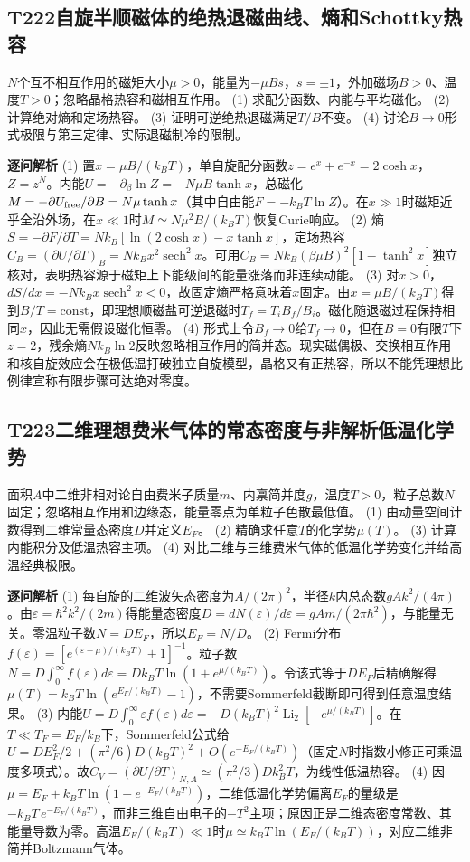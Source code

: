 \subsection*{T222\quad 自旋半顺磁体的绝热退磁曲线、熵和Schottky热容}
$N$个互不相互作用的磁矩大小$\mu>0$，能量为$-\mu Bs$，$s=\pm1$，外加磁场$B>0$、温度$T>0$；忽略晶格热容和磁相互作用。
(1) 求配分函数、内能与平均磁化。
(2) 计算绝对熵和定场热容。
(3) 证明可逆绝热退磁满足$T/B$不变。
(4) 讨论$B\to0$形式极限与第三定律、实际退磁制冷的限制。
\par\textbf{逐问解析}
(1) 置$x=\mu B/(k_BT)$，单自旋配分函数$z=e^x+e^{-x}=2\cosh x$，$Z=z^N$。内能$U=-\partial_\beta\ln Z=-N\mu B\tanh x$，总磁化$M=-\partial U_{\rm free}/\partial B=N\mu\tanh x$（其中自由能$F=-k_BT\ln Z$）。在$x\gg1$时磁矩近乎全沿外场，在$x\ll1$时$M\simeq N\mu^2B/(k_BT)$恢复Curie响应。
(2) 熵$S=-\partial F/\partial T=Nk_B[\ln(2\cosh x)-x\tanh x]$，定场热容$C_B=(\partial U/\partial T)_B=Nk_Bx^2\operatorname{sech}^2x$。可用$C_B=Nk_B(\beta\mu B)^2[1-\tanh^2x]$独立核对，表明热容源于磁矩上下能级间的能量涨落而非连续动能。
(3) 对$x>0$，$dS/dx=-Nk_Bx\operatorname{sech}^2x<0$，故固定熵严格意味着$x$固定。由$x=\mu B/(k_BT)$得到$B/T=\mathrm{const}$，即理想顺磁盐可逆退磁时$T_f=T_iB_f/B_i$。磁化随退磁过程保持相同$x$，因此无需假设磁化恒零。
(4) 形式上令$B_f\to0$给$T_f\to0$，但在$B=0$有限$T$下$z=2$，残余熵$Nk_B\ln2$反映忽略相互作用的简并态。现实磁偶极、交换相互作用和核自旋效应会在极低温打破独立自旋模型，晶格又有正热容，所以不能凭理想比例律宣称有限步骤可达绝对零度。
\par\medskip
\subsection*{T223\quad 二维理想费米气体的常态密度与非解析低温化学势}
面积$A$中二维非相对论自由费米子质量$m$、内禀简并度$g$，温度$T>0$，粒子总数$N$固定；忽略相互作用和边缘态，能量零点为单粒子色散最低值。
(1) 由动量空间计数得到二维常量态密度$D$并定义$E_F$。
(2) 精确求任意$T$的化学势$\mu(T)$。
(3) 计算内能积分及低温热容主项。
(4) 对比二维与三维费米气体的低温化学势变化并给高温经典极限。
\par\textbf{逐问解析}
(1) 每自旋的二维波矢态密度为$A/(2\pi)^2$，半径$k$内总态数$gAk^2/(4\pi)$。由$\varepsilon=\hbar^2k^2/(2m)$得能量态密度$D=dN(\varepsilon)/d\varepsilon=gAm/(2\pi\hbar^2)$，与能量无关。零温粒子数$N=DE_F$，所以$E_F=N/D$。
(2) Fermi分布$f(\varepsilon)=[e^{(\varepsilon-\mu)/(k_BT)}+1]^{-1}$。粒子数$N=D\int_0^\infty f(\varepsilon)d\varepsilon=Dk_BT\ln(1+e^{\mu/(k_BT)})$。令该式等于$DE_F$后精确解得$\mu(T)=k_BT\ln(e^{E_F/(k_BT)}-1)$，不需要Sommerfeld截断即可得到任意温度结果。
(3) 内能$U=D\int_0^\infty\varepsilon f(\varepsilon)d\varepsilon=-D(k_BT)^2\operatorname{Li}_2[-e^{\mu/(k_BT)}]$。在$T\ll T_F=E_F/k_B$下，Sommerfeld公式给$U=DE_F^2/2+(\pi^2/6)D(k_BT)^2+O(e^{-E_F/(k_BT)})$（固定$N$时指数小修正可乘温度多项式）。故$C_V=(\partial U/\partial T)_{N,A}\simeq(\pi^2/3)Dk_B^2T$，为线性低温热容。
(4) 因$\mu=E_F+k_BT\ln(1-e^{-E_F/(k_BT)})$，二维低温化学势偏离$E_F$的量级是$-k_BT\,e^{-E_F/(k_BT)}$，而非三维自由电子的$-T^2$主项；原因正是二维态密度常数、其能量导数为零。高温$E_F/(k_BT)\ll1$时$\mu\simeq k_BT\ln(E_F/(k_BT))$，对应二维非简并Boltzmann气体。
\par\medskip
